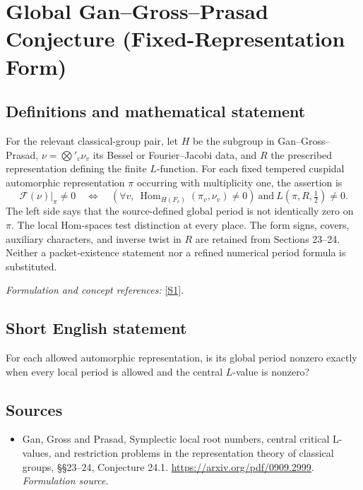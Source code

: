 \documentclass[11pt]{article}
\begin{document}
\section*{\texorpdfstring{Global Gan–Gross–Prasad Conjecture (Fixed-Representation Form)}{Global Gan–Gross–Prasad Conjecture (Fixed-Representation Form)}}\label{statement}
\subsection{Definitions and mathematical statement}
For the relevant classical-group pair, let $H$ be the subgroup in Gan--Gross--Prasad, $\nu=\bigotimes'_v\nu_v$ its Bessel or Fourier--Jacobi data, and $R$ the prescribed representation defining the finite $L$-function. For each fixed tempered cuspidal automorphic representation $\pi$ occurring with multiplicity one, the assertion is
\[
 \mathcal F(\nu)|_\pi\ne0
 \quad\Longleftrightarrow\quad
 \left(\forall v,\ \operatorname{Hom}_{H(F_v)}(\pi_v,\nu_v)\ne0\right)
 \ \text{and}\ L(\pi,R,\tfrac12)\ne0.
\]
The left side says that the source-defined global period is not identically zero on $\pi$. The local Hom-spaces test distinction at every place. The form signs, covers, auxiliary characters, and inverse twist in $R$ are retained from Sections 23--24. Neither a packet-existence statement nor a refined numerical period formula is substituted.
\par\smallskip\textit{Formulation and concept references:} \href{https://arxiv.org/pdf/0909.2999}{[S1]}.

\subsection{Short English statement}
For each allowed automorphic representation, is its global period nonzero exactly when every local period is allowed and the central $L$-value is nonzero?
\subsection{Sources}
\begin{itemize}
\item[S1]Gan, Gross and Prasad, Symplectic local root numbers, central critical L-values, and restriction problems in the representation theory of classical groups, §§23–24, Conjecture 24.1.
\url{https://arxiv.org/pdf/0909.2999}.
\textit{Formulation source.}
\end{itemize}
\end{document}
